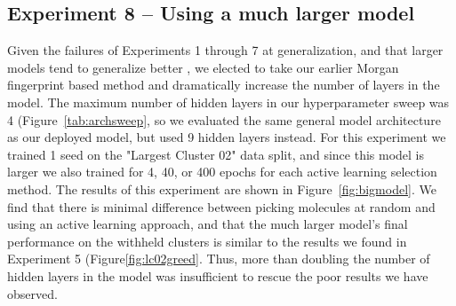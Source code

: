\documentclass[journal=jmcmar,manuscript=article]{achemso}
\begin{document}
\subsection{Experiment 8 -- Using a much larger model}

Given the failures of Experiments 1 through 7 at generalization, and that larger models tend to generalize better \cite{bigmodelgeneralize}, we elected to take our earlier Morgan fingerprint based method and dramatically increase the number of layers in the model. The maximum number of hidden layers in our hyperparameter sweep was 4 (Figure~\ref{tab:archsweep}, so we evaluated the same general model architecture as our deployed model, but used 9 hidden layers instead. For this experiment we trained 1 seed on the "Largest Cluster 02" data split, and since this model is larger we also trained for 4, 40, or 400 epochs for each active learning selection method. The results of this experiment are shown in Figure~\ref{fig:bigmodel}. We find that there is minimal difference between picking molecules at random and using an active learning approach, and that the much larger model's final performance on the withheld clusters is similar to the results we found in Experiment 5 (Figure\ref{fig:lc02greed}. Thus, more than doubling the number of hidden layers in the model was insufficient to rescue the poor results we have observed.
\end{document}
